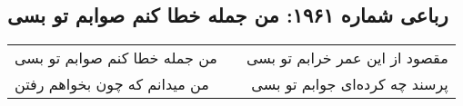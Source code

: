 \begin{center}
\section*{رباعی شماره ۱۹۶۱: من جمله خطا کنم صوابم تو بسی}
\label{sec:1961}
\begin{longtable}{l p{0.5cm} r}
من جمله خطا کنم صوابم تو بسی
&&
مقصود از این عمر خرابم تو بسی
\\
من میدانم که چون بخواهم رفتن
&&
پرسند چه کرده‌ای جوابم تو بسی
\\
\end{longtable}
\end{center}
